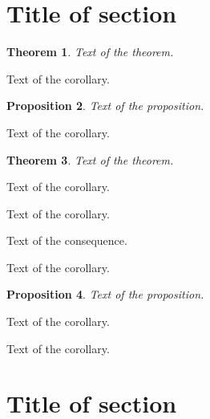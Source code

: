 \documentclass{article}
\newtheorem{theorem}{Theorem}[section]
\newtheorem{proposition}[theorem]{Proposition}
\begin{document}
\section{Title of section}

\begin{theorem}
	Text of the theorem.
\end{theorem}

\begin{corollary}
	Text of the corollary.
\end{corollary}

\begin{proposition}
	Text of the proposition.
\end{proposition}

\begin{corollary}
	Text of the corollary.
\end{corollary}

\begin{theorem}
	Text of the theorem.
\end{theorem}

\begin{corollary}
	Text of the corollary.
\end{corollary}

\begin{corollary}
	Text of the corollary.
\end{corollary}

\begin{consequence}
	Text of the consequence.
\end{consequence}

\begin{corollary}
	Text of the corollary.
\end{corollary}

\begin{proposition}
	Text of the proposition.
\end{proposition}

\begin{corollary}
	Text of the corollary.
\end{corollary}

\begin{corollary}
	Text of the corollary.
\end{corollary}


\section{Title of section}
\end{document}
